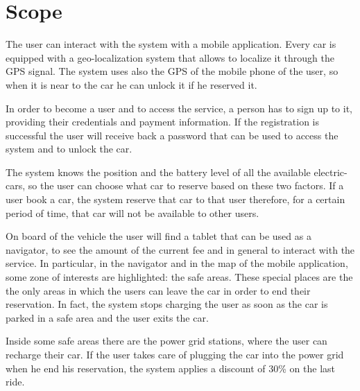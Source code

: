 \section{Scope}
The user can interact with the system with a mobile application.
Every car is equipped with a geo-localization system that allows to localize it through the GPS signal.
The system uses also the GPS of the mobile phone of the user, so when it is near to the car he can unlock it if he reserved it.

In order to become a user and to access the service, a person has to sign up to it, providing their credentials and payment information. If the registration is successful the user will receive back a password that can be used to access the system and to unlock the car.

The system knows the position and the battery level of all the available electric-cars, so the user can choose what car to reserve based on these two factors. If a user book a car, the system reserve that car to that user therefore, for a certain period of time, that car will not be available to other users.

On board of the vehicle the user will find a tablet that can be used as a navigator, to see the amount of the current fee and in general to interact with the service. In particular, in the navigator and in the map of the mobile application, some zone of interests are highlighted: the safe areas. These special places are the the only areas in which the users can leave the car in order to end their reservation. In fact, the system stops charging the user as soon as the car is parked in a safe area and the user exits the car.

Inside some safe areas there are the power grid stations, where the user can recharge their car. If the user takes care of plugging the car into the power grid when he end his reservation, the system applies a discount of 30\% on the last ride.
